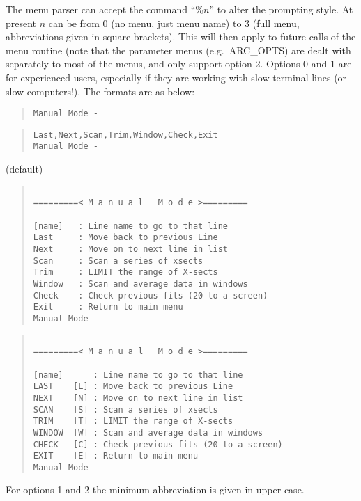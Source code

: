 The menu parser can accept the command ``\%$n$'' to alter the prompting
style.
At present $n$ can be from 0 (no menu, just menu name) to 3 (full menu,
abbreviations given in square brackets).
This will then apply to future calls of the menu routine (note that the
parameter menus (e.g.\ ARC\_OPTS) are dealt with separately to most of
the menus, and only support option 2.
Options 0 and 1 are for experienced users, especially if they are
working with slow terminal lines (or slow computers!).
The formats are as below:
\begin{list}{Option :}{}
\setcounter{menus}{0}
\item[Option 0]
\hspace*{150 mm}
\begin{quote}\begin{verbatim}
Manual Mode -
\end{verbatim}\end{quote}
\item\samepage
\hspace*{150 mm}
\begin{quote}\begin{verbatim}
Last,Next,Scan,Trim,Window,Check,Exit
Manual Mode -
\end{verbatim}\end{quote}
\item (default)
\hspace*{150 mm}
\begin{quote}\begin{verbatim}

=========< M a n u a l   M o d e >=========
 
[name]   : Line name to go to that line
Last     : Move back to previous Line
Next     : Move on to next line in list
Scan     : Scan a series of xsects
Trim     : LIMIT the range of X-sects
Window   : Scan and average data in windows
Check    : Check previous fits (20 to a screen)
Exit     : Return to main menu
Manual Mode -
\end{verbatim}\end{quote}
\item
\hspace*{150 mm}
\begin{quote}\begin{verbatim}

=========< M a n u a l   M o d e >=========
 
[name]      : Line name to go to that line
LAST    [L] : Move back to previous Line
NEXT    [N] : Move on to next line in list
SCAN    [S] : Scan a series of xsects
TRIM    [T] : LIMIT the range of X-sects
WINDOW  [W] : Scan and average data in windows
CHECK   [C] : Check previous fits (20 to a screen)
EXIT    [E] : Return to main menu
Manual Mode -
\end{verbatim}\end{quote}
\end{list}
For options 1 and 2 the minimum abbreviation is given in upper case.

